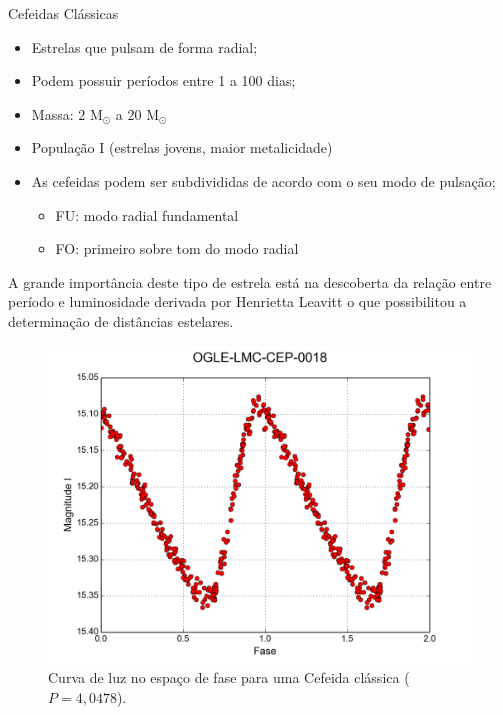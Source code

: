 \documentclass{beamer}
\begin{document}
\begin{frame}[allowframebreaks]{Cefeidas Clássicas}
\begin{itemize}
   \item Estrelas que pulsam de forma radial;
   \item Podem possuir períodos entre 1 a 100 dias;
   \item Massa: $2$ M$_\odot$ a $20$ M$_\odot$
   \item População I (estrelas jovens, maior metalicidade)
   \item As cefeidas podem ser subdivididas de acordo com o seu modo de pulsação;
   \begin{itemize}
     \item FU: modo radial fundamental
     \item FO: primeiro sobre tom do modo radial
   \end{itemize}
 \end{itemize}

A grande importância deste tipo de estrela está na descoberta da relação entre
período e luminosidade derivada por Henrietta Leavitt \citep{Leavitt1912} o que possibilitou a determinação de distâncias estelares.

\framebreak

\begin{figure}
 \centering
  \includegraphics[width=0.68\linewidth]{0018_correct.png}
  \caption{Curva de luz no espaço de fase para uma Cefeida clássica ($P=4,0478$).}
  \label{fig:right}
\end{figure}
\end{frame}
\end{document}
